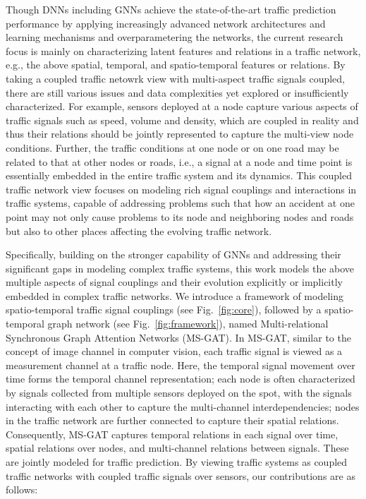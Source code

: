 Though DNNs including GNNs achieve the state-of-the-art traffic prediction performance by applying increasingly advanced network architectures and learning mechanisms and overparametering the networks, the current research focus is mainly on characterizing latent features and relations in a traffic network, e.g., the above spatial, temporal, and spatio-temporal features or relations. By taking a coupled traffic netowrk view with multi-aspect traffic signals coupled, there are still various issues and data complexities yet explored or insufficiently characterized. For example, sensors deployed at a node capture various aspects of traffic signals such as speed, volume and density, which are coupled in reality and thus their relations should be jointly represented to capture the multi-view node conditions. Further, the traffic conditions at one node or on one road may be related to that at other nodes or roads, i.e., a signal at a node and time point is essentially embedded in the entire traffic system and its dynamics. This coupled traffic network view focuses on modeling rich signal couplings and interactions in traffic systems, capable of addressing problems such that how an accident at one point may not only cause problems to its node and neighboring nodes and roads but also to other places affecting the evolving traffic network.

Specifically, building on the stronger capability of GNNs and addressing their significant gaps in modeling complex traffic systems, this work models the above multiple aspects of signal couplings and their evolution explicitly or implicitly embedded in complex traffic networks. We introduce a framework of modeling spatio-temporal traffic signal couplings (see Fig.~\ref{fig:core}), followed by a spatio-temporal graph network (see Fig.~\ref{fig:framework}), named Multi-relational Synchronous Graph Attention Networks (MS-GAT). In MS-GAT, similar to the concept of image channel in computer vision, each traffic signal is viewed as a measurement channel at a traffic node. Here, the temporal signal movement over time forms the temporal channel representation; each node is often characterized by signals collected from multiple sensors deployed on the spot, with the signals interacting with each other to capture the multi-channel interdependencies; nodes in the traffic network are further connected to capture their spatial relations. Consequently, MS-GAT captures temporal relations in each signal over time, spatial relations over nodes, and multi-channel relations between signals. These are jointly modeled for traffic prediction. By viewing traffic systems as coupled traffic networks with coupled traffic signals over sensors, our contributions are as follows:

